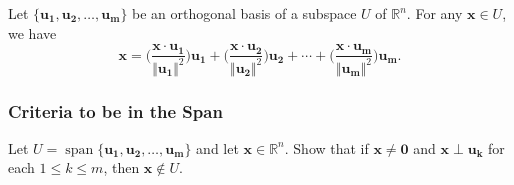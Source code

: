\documentclass[20pt,a4paper]{extarticle}
\DeclareMathOperator{\Span}{span}
\newcounter{example}
\newcounter{theorem}
\begin{document}
	\begin{solution}

	\end{solution}

	\newpage 

	\phantom{2}

	\vfill

	\begin{theorem}
	Let $\{ \mathbf{u_1} , \mathbf{u_2} , \ldots , \mathbf{u_m} \}$ be an orthogonal basis of a subspace $U$ of $\mathbb{R}^n$. For any $\mathbf{x} \in U$, we have
		\[
			\mathbf{x} = \Big( \frac{\mathbf{x} \cdot \mathbf{u_1}}{\Vert \mathbf{u_1} \Vert^2} \Big) \mathbf{u_1} + \Big( \frac{\mathbf{x} \cdot \mathbf{u_2}}{\Vert \mathbf{u_2} \Vert^2} \Big) \mathbf{u_2} + \cdots + \Big( \frac{\mathbf{x} \cdot \mathbf{u_m}}{\Vert \mathbf{u_m} \Vert^2} \Big) \mathbf{u_m} .
		\]
	\end{theorem}

	\newpage 

	\subsubsection{Criteria to be in the Span}

	\begin{example}
	Let $U = \Span \{ \mathbf{u_1} , \mathbf{u_2} , \ldots , \mathbf{u_m} \}$ and let $\mathbf{x} \in \mathbb{R}^n$. Show that if $\mathbf{x} \neq \mathbf{0}$ and $\mathbf{x} \perp \mathbf{u_k}$ for each $1 \leq k \leq m$, then $\mathbf{x} \not\in U$.
	\end{example}

	\begin{solution}

	\end{solution}
\end{document}

